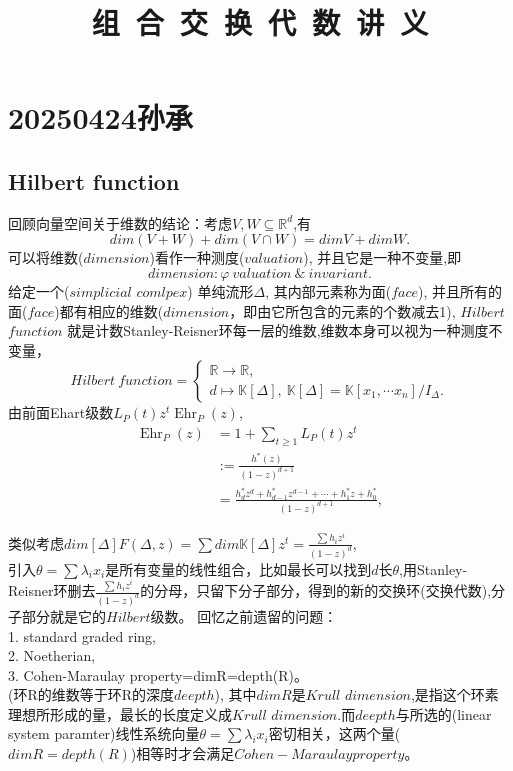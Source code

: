 \documentclass[12pt,a4paper]{ctexbook} %
\title{{\kaishu\fontsize{48}{60}\selectfont 组~合~交~换~代~数~讲~义}} %
\numberwithin{figure}{section}
\theoremstyle{problemstyle}
\numberwithin{equation}{section} %
\begin{document}
\section{20250424孙承}
\subsection{Hilbert function}

回顾向量空间关于维数的结论：考虑$V ,W \subseteq  \mathbb{R}^d$,有 $$ dim(V+W)+dim(V\cap W)=dimV+dimW .$$
可以将维数($dimension$)看作一种测度($valuation$), 并且它是一种不变量,即
$$ dimension : \varphi \ valuation \ \& \ invariant. $$
给定一个($simplicial$ $comlpex$) 单纯流形$\Delta$, 其内部元素称为面($face$), 并且所有的面($face$)都有相应的维数($dimension$，即由它所包含的元素的个数减去1),
 $Hilbert$ $function$ 就是计数Stanley-Reisner环每一层的维数,维数本身可以视为一种测度不变量，
    $$ Hilbert \ function=
	\begin{cases}
		\mathbb{R}\rightarrow\mathbb{R}, \\ 
		d\mapsto\mathbb{K}[\Delta] ,\ \mathbb{K}[\Delta]=\mathbb{K}[x_{1}, \cdots x_{n}]/I_{\Delta}.
	\end{cases}$$
由前面Ehart级数$L_P(t) z^t$\rightarrow$\operatorname{Ehr}_P(z)$,
\begin{align*}
    \operatorname{Ehr}_P(z) 
    &= 1 + \sum_{t \geq 1} L_P(t) z^t \\
    &:= \frac{h^*(z)}{(1-z)^{d+1}} \\
    &=\frac{h_d^* z^d + h_{d-1}^* z^{d-1} + \cdots + h_1^* z + h_0^*}{(1 - z)^{d+1}},
\end{align*}

类似考虑$dim[\Delta]$\rightarrow$F(\Delta,z)=\sum dim\mathbb{K}[\Delta]z^{t}=\frac{\sum h_{i}z^{i}}{(1-z)^{d}}$,\\
引入$\theta =\sum \lambda_{i}x_{i}$是所有变量的线性组合，比如最长可以找到$d$长$\theta$,用Stanley-Reisner环删去$\frac{\sum h_{i}z^{i}}{(1-z)^{d}}$的分母，只留下分子部分，得到的新的交换环(交换代数),分子部分就是它的$Hilbert$级数。
回忆之前遗留的问题：\\
1. standard graded ring,\\
2.  Noetherian,\\
3. Cohen-Maraulay property=dimR=depth(R)。\\(环R的维数等于环R的深度$deepth$),
其中$dimR$是$Krull$ $dimension$,是指这个环素理想所形成的量，最长的长度定义成$Krull$ $dimension$.而$deepth$与所选的(linear system paramter)线性系统向量$\theta =\sum \lambda_{i}x_{i}$密切相关，这两个量($dimR=depth(R)$)相等时才会满足$Cohen-Maraulay property$。
\end{document}
